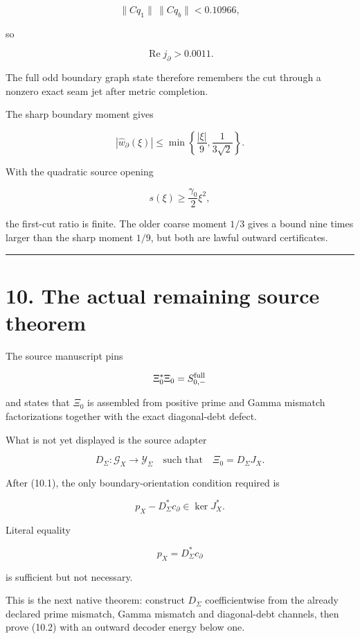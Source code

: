 \[
\|Cq_1\|\,\|Cq_b\|<0.10966,
\]

so

\[
\boxed{
\operatorname{Re}j_\partial>0.0011.
}
\tag{9.1}
\]

The full odd boundary graph state therefore remembers the cut through a
nonzero exact seam jet after metric completion.

The sharp boundary moment gives

\[
|\widehat w_\partial(\xi)|
\le
\min\left\{
\frac{|\xi|}{9},
\frac1{3\sqrt2}
\right\}.
\]

With the quadratic source opening

\[
s(\xi)\ge\frac{\gamma_0}{2}\xi^2,
\]

the first-cut ratio is finite. The older coarse moment \(1/3\) gives a bound
nine times larger than the sharp moment \(1/9\), but both are lawful outward
certificates.

\begin{center}\rule{0.5\linewidth}{0.5pt}\end{center}

\hypertarget{the-actual-remaining-source-theorem}{%
\section{10. The actual remaining source theorem}\label{the-actual-remaining-source-theorem}}

The source manuscript pins

\[
\Xi_0^*\Xi_0=S_{0,-}^{\rm full}
\]

and states that \(\Xi_0\) is assembled from positive prime and Gamma mismatch
factorizations together with the exact diagonal-debt defect.

What is not yet displayed is the source adapter

\[
\boxed{
D_\Sigma:\mathcal G_X\to\mathcal Y_\Sigma
\quad\text{such that}\quad
\Xi_0=D_\Sigma J_X.
}
\tag{10.1}
\]

After (10.1), the only boundary-orientation condition required is

\[
\boxed{
 p_X-D_\Sigma^*c_\partial
\in\ker J_X^*.
}
\tag{10.2}
\]

Literal equality

\[
p_X=D_\Sigma^*c_\partial
\]

is sufficient but not necessary.

This is the next native theorem: construct \(D_\Sigma\) coefficientwise from
the already declared prime mismatch, Gamma mismatch and diagonal-debt channels,
then prove (10.2) with an outward decoder energy below one.

